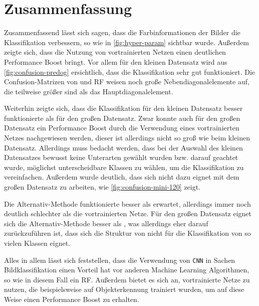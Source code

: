 \chapter{Zusammenfassung}
Zusammenfassend lässt sich sagen, dass die Farbinformationen der Bilder die
Klassifikation verbessern, so wie in \autoref{fig:hyper-param} sichtbar wurde.
Außerdem zeigte sich, dass die Nutzung von vortrainierten Netzen einen
deutlichen Performance Boost bringt. Vor allem für den kleinen Datensatz wird
aus \autoref{fig:confusion-predog} ersichtlich, dass die Klassifikation sehr gut
funktioniert. Die Confusion-Matrizen von \MiniDog und RF weisen noch große
Nebendiagonalelemente auf, die teilweise größer sind als das
Hauptdiagonalelement.

Weiterhin zeigte sich, dass die Klassifikation für den kleinen Datensatz besser
funktionierte als für den großen Datensatz. Zwar konnte auch für den großen
Datensatz ein Performance Boost durch die Verwendung eines vortrainierten Netzes
nachgewiesen werden, dieser ist allerdings nicht so groß wie beim kleinen
Datensatz. Allerdings muss bedacht werden, dass bei der Auswahl des kleinen
Datensatzes bewusst keine Unterarten gewählt wurden bzw. darauf geachtet wurde,
möglichst unterscheidbare Klassen zu wählen, um die Klassifikation zu
vereinfachen. Außerdem wurde deutlich, dass sich \MiniDog nicht dazu eignet mit
dem großen Datensatz zu arbeiten, wie \autoref{fig:confusion-mini-120} zeigt.

Die Alternativ-Methode funktionierte besser als erwartet, allerdings immer noch
deutlich schlechter als die vortrainierten Netze. Für den großen Datensatz
eignet sich die Alternativ-Methode besser als \MiniDog, was allerdings eher
darauf zurückzuführen ist, dass sich die Struktur von \MiniDog nicht für die
Klassifikation von so vielen Klassen eignet.

Alles in allem lässt sich feststellen, dass die Verwendung von \texttt{CNN} in
Sachen Bildklassifikation einen Vorteil hat vor anderen Machine Learning
Algorithmen, so wie in diesem Fall ein RF. Außerdem bietet es sich an,
vortrainierte Netze zu nutzen, die beispielsweise auf Objekterkennung trainiert
wurden, um auf diese Weise einen Performance Boost zu erhalten.
